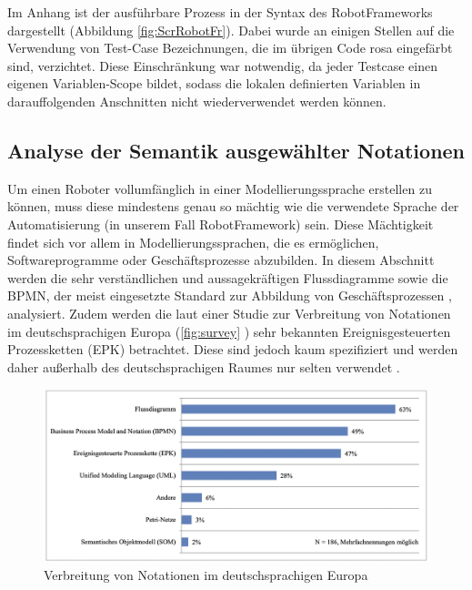 Im Anhang ist der ausführbare Prozess in der Syntax des RobotFrameworks dargestellt (Abbildung \ref{fig:ScrRobotFr}). Dabei wurde an einigen Stellen auf die Verwendung von Test-Case Bezeichnungen, die im übrigen Code rosa eingefärbt sind, verzichtet. Diese Einschränkung war notwendig, da jeder Testcase einen eigenen Variablen-Scope bildet, sodass die  lokalen definierten Variablen in darauffolgenden Anschnitten nicht wiederverwendet werden können.

\subsection{Analyse der Semantik ausgewählter Notationen}

Um einen Roboter vollumfänglich in einer Modellierungssprache erstellen zu können, muss diese mindestens genau so mächtig wie die verwendete Sprache der Automatisierung (in unserem Fall RobotFramework) sein. Diese Mächtigkeit findet sich vor allem in Modellierungssprachen, die es ermöglichen, Softwareprogramme oder Geschäftsprozesse abzubilden. In diesem Abschnitt werden die sehr verständlichen und aussagekräftigen Flussdiagramme \cite{WILHELM2007} sowie die BPMN, der meist eingesetzte Standard zur Abbildung von Geschäftsprozessen \cite{Fleischmann2018}, analysiert. Zudem werden die laut einer Studie zur Verbreitung von Notationen im deutschsprachigen Europa (\autoref{fig:survey} \cite{mastersthesisLobe}) sehr bekannten Ereignisgesteuerten Prozessketten (EPK) betrachtet. Diese sind jedoch kaum spezifiziert und werden daher außerhalb des deutschsprachigen Raumes nur selten verwendet \cite{Clemente2011}.

\begin{figure}[h!]
    \centering
    \includegraphics[width=1.03\textwidth]{images/studie_Modellierungssprachen.png}
    \caption{Verbreitung von Notationen im deutschsprachigen Europa}
    \label{fig:survey}
\end{figure}

